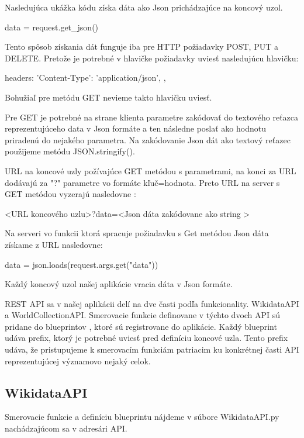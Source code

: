 Nasledujúca ukážka kódu získa dáta ako Json prichádzajúce na koncový uzol. 
\begin{code}
      data = request.get_json()
\end{code}

Tento spôsob získania dát funguje iba pre HTTP požiadavky POST, PUT a DELETE. Pretože je potrebné v hlavičke požiadavky uviesť nasledujúcu hlavičku: 
\begin{code}
headers: {
      'Content-Type': 'application/json',
},
\end{code}

Bohužiaľ pre metódu GET nevieme takto hlavičku uviesť. 

Pre GET je potrebné na strane klienta parametre zakódovať do textového reťazca reprezentujúceho data v Json formáte a ten následne poslať ako hodnotu priradenú do nejakého parametra. Na zakódovanie Json dát ako textový reťazec použijeme metódu JSON.stringify(). 

URL na koncové uzly požívajúce GET metódou s parametrami, na konci za URL dodávajú za "?" parametre vo formáte kľuč=hodnota. 
Preto URL na server s GET metódou vyzerajú nasledovne : 

\begin{code}
      <URL koncového uzlu>?data=<Json dáta zakódovane ako string >
\end{code}

Na serveri vo funkcii ktorá spracuje požiadavku s Get metódou Json dáta získame z URL nasledovne: 
\begin{code}
      data = json.loads(request.args.get("data"))
\end{code}

Každý koncový uzol našej aplikácie vracia dáta v Json formáte. 

REST API sa v našej aplikácii delí na dve časti podľa funkcionality. WikidataAPI a WorldCollectionAPI. Smerovacie funkcie definovane v týchto dvoch API sú pridane do blueprintov , ktoré sú registrovane do aplikácie. 
Každý blueprint udáva prefix, ktorý je potrebné uviesť pred definíciu koncové uzla. Tento prefix udáva, že pristupujeme k smerovacím funkciám patriacim ku konkrétnej časti API reprezentujúcej významovo nejaký celok. 

\subsection*{WikidataAPI}
Smerovacie funkcie a definíciu blueprintu nájdeme v súbore WikidataAPI.py nachádzajúcom sa v adresári API. 

